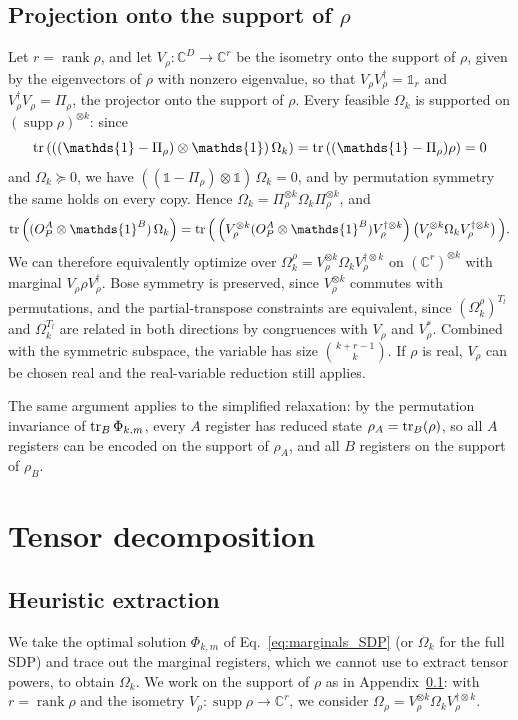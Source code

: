 \documentclass[aps,pra,twocolumn,showpacs,superscriptaddress,groupedaddress]{revtex4-2}
\newcommand{\one}[0]{\mathds{1}}
\newcommand{\C}{\mathds{C}}
\newcommand{\I}{\one}
\begin{document}
\begin{widetext}
\subsection{Projection onto the support of $\rho$}\label{app:supportReduction}
Let $r = \operatorname{rank} \rho$, and let $V_\rho: \C^D \to \C^r$ be the isometry onto the support of $\rho$, given by the eigenvectors of $\rho$ with nonzero eigenvalue, so that $V_\rho V_\rho^\dagger=\I_r$ and $V_\rho^\dagger V_\rho=\Pi_\rho$, the projector onto the support of $\rho$. Every feasible $\Omega_k$ is supported on $(\operatorname{supp}\rho)^{\otimes k}$: since
\begin{equation}
    \tr\left(((\I-\Pi_\rho)\otimes\I)\,\Omega_k\right)=\tr\left((\I-\Pi_\rho)\rho\right)=0
\end{equation}
and $\Omega_k\succeq0$, we have $((\I-\Pi_\rho)\otimes\I)\,\Omega_k=0$, and by permutation symmetry the same holds on every copy. Hence $\Omega_k=\Pi_\rho^{\otimes k}\Omega_k\Pi_\rho^{\otimes k}$, and
\begin{equation}
    \tr\left((O_P^A\otimes\I^B)\,\Omega_k\right)=\tr\Big(\left(V_\rho^{\otimes k}(O_P^A\otimes\I^B)V_\rho^{\dagger\otimes k}\right)\left(V_\rho^{\otimes k}\Omega_kV_\rho^{\dagger\otimes k}\right)\Big).
\end{equation}
We can therefore equivalently optimize over $\Omega_k^\rho=V_\rho^{\otimes k}\Omega_kV_\rho^{\dagger\otimes k}$ on $(\C^r)^{\otimes k}$ with marginal $V_\rho\rho V_\rho^\dagger$. Bose symmetry is preserved, since $V_\rho^{\otimes k}$ commutes with permutations, and the partial-transpose constraints are equivalent, since $(\Omega_k^\rho)^{T_l}$ and $\Omega_k^{T_l}$ are related in both directions by congruences with $V_\rho$ and $V_\rho^*$. Combined with the symmetric subspace, the variable has size $\binom{k+r-1}{k}$. If $\rho$ is real, $V_\rho$ can be chosen real and the real-variable reduction still applies.

The same argument applies to the simplified relaxation: by the permutation invariance of $\tr_B\Phi_{k,m}$, every $A$ register has reduced state $\rho_A=\tr_B(\rho)$, so all $A$ registers can be encoded on the support of $\rho_A$, and all $B$ registers on the support of $\rho_B$.


\section{Tensor decomposition}
\subsection{Heuristic extraction}\label{app:tensor}
We take the optimal solution $\Phi_{k,m}$ of Eq.~\eqref{eq:marginals_SDP} (or $\Omega_k$ for the full SDP) and trace out the marginal registers, which we cannot use to extract tensor powers, to obtain $\Omega_k$. We work on the support of $\rho$ as in Appendix~\ref{app:supportReduction}: with $r=\operatorname{rank}\rho$ and the isometry $V_\rho:\operatorname{supp}\rho\to\C^r$, we consider $\Omega_\rho=V_\rho^{\otimes k}\Omega_kV_\rho^{\dagger\otimes k}$.


\end{widetext}
\end{document}
